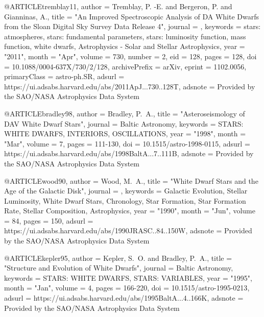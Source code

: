 \documentclass[a4paper,fleqn,usenatbib]{mnras}
\begin{document}
{{{{{{{{{{{@ARTICLE{tremblay11,
       author = {{Tremblay}, P. -E. and {Bergeron}, P. and {Gianninas}, A.},
        title = "{An Improved Spectroscopic Analysis of DA White Dwarfs from the Sloan Digital Sky Survey Data Release 4}",
      journal = {\apj},
     keywords = {stars: atmospheres, stars: fundamental parameters, stars: luminosity function, mass function, white dwarfs, Astrophysics - Solar and Stellar Astrophysics},
         year = "2011",
        month = "Apr",
       volume = {730},
       number = {2},
          eid = {128},
        pages = {128},
          doi = {10.1088/0004-637X/730/2/128},
archivePrefix = {arXiv},
       eprint = {1102.0056},
 primaryClass = {astro-ph.SR},
       adsurl = {https://ui.adsabs.harvard.edu/abs/2011ApJ...730..128T},
      adsnote = {Provided by the SAO/NASA Astrophysics Data System}
}

@ARTICLE{bradley98,
       author = {{Bradley}, P.~A.},
        title = "{Asteroseismology of DAV White Dwarf Stars}",
      journal = {Baltic Astronomy},
     keywords = {STARS: WHITE DWARFS, INTERIORS, OSCILLATIONS},
         year = "1998",
        month = "Mar",
       volume = {7},
        pages = {111-130},
          doi = {10.1515/astro-1998-0115},
       adsurl = {https://ui.adsabs.harvard.edu/abs/1998BaltA...7..111B},
      adsnote = {Provided by the SAO/NASA Astrophysics Data System}
}

@ARTICLE{wood90,
       author = {{Wood}, M.~A.},
        title = "{White Dwarf Stars and the Age of the Galactic Disk}",
      journal = {\jrasc},
     keywords = {Galactic Evolution, Stellar Luminosity, White Dwarf Stars, Chronology, Star Formation, Star Formation Rate, Stellar Composition, Astrophysics},
         year = "1990",
        month = "Jun",
       volume = {84},
        pages = {150},
       adsurl = {https://ui.adsabs.harvard.edu/abs/1990JRASC..84..150W},
      adsnote = {Provided by the SAO/NASA Astrophysics Data System}
}

@ARTICLE{kepler95,
       author = {{Kepler}, S.~O. and {Bradley}, P.~A.},
        title = "{Structure and Evolution of White Dwarfs}",
      journal = {Baltic Astronomy},
     keywords = {STARS: WHITE DWARFS, STARS: VARIABLES},
         year = "1995",
        month = "Jan",
       volume = {4},
        pages = {166-220},
          doi = {10.1515/astro-1995-0213},
       adsurl = {https://ui.adsabs.harvard.edu/abs/1995BaltA...4..166K},
      adsnote = {Provided by the SAO/NASA Astrophysics Data System}
}

}}}}}}}}}}}
\end{document}
